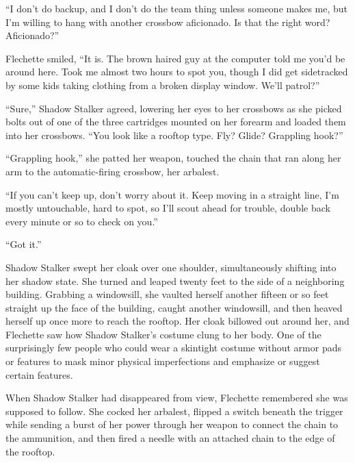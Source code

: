 ``I don't do backup, and I don't do the team thing unless someone makes me, but I'm willing to hang with another crossbow aficionado.  Is that the right word?  Aficionado?''



Flechette smiled, ``It is.  The brown haired guy at the computer told me you'd be around here.  Took me almost two hours to spot you, though I did get sidetracked by some kids taking clothing from a broken display window.  We'll patrol?''



``Sure,'' Shadow Stalker agreed, lowering her eyes to her crossbows as she picked bolts out of one of the three cartridges mounted on her forearm and loaded them into her crossbows.  ``You look like a rooftop type.  Fly?  Glide?  Grappling hook?''



``Grappling hook,'' she patted her weapon, touched the chain that ran along her arm to the automatic-firing crossbow, her arbalest.



``If you can't keep up, don't worry about it.  Keep moving in a straight line, I'm mostly untouchable, hard to spot, so I'll scout ahead for trouble, double back every minute or so to check on you.''



``Got it.''



Shadow Stalker swept her cloak over one shoulder, simultaneously shifting into her shadow state.  She turned and leaped twenty feet to the side of a neighboring building.  Grabbing a windowsill, she vaulted herself another fifteen or so feet straight up the face of the building, caught another windowsill, and then heaved herself up once more to reach the rooftop.  Her cloak billowed out around her, and Flechette saw how Shadow Stalker's costume clung to her body.  One of the surprisingly few people who could wear a skintight costume without armor pads or features to mask minor physical imperfections and emphasize or suggest certain features.



When Shadow Stalker had disappeared from view, Flechette remembered she was supposed to follow.  She cocked her arbalest, flipped a switch beneath the trigger while sending a burst of her power through her weapon to connect the chain to the ammunition, and then fired a needle with an attached chain to the edge of the rooftop.



